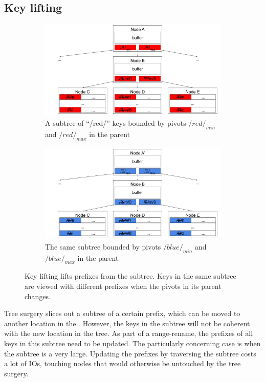\subsection{Key lifting}

\begin{figure}
    \begin{subfigure}{\textwidth}
        \centering
        \includegraphics[width=.9\linewidth]{fig/lift-1}
        \caption{\label{subfig:lift-1} A subtree of ``/red/'' keys bounded by
            pivots $/red/_{min}$ and $/red/_{max}$ in the parent}
    \end{subfigure}
    \begin{subfigure}{\textwidth}
        \centering
        \includegraphics[width=.9\linewidth]{fig/lift-2}
        \caption{\label{subfig:lift-2} The same subtree bounded by pivots
            $/blue/_{min}$ and $/blue/_{max}$ in the parent}
    \end{subfigure}
    \caption[Key lifting example]{\label{fig:lift}
        Key lifting lifts prefixes from the subtree. Keys in the same subtree
        are viewed with different prefixes when the pivots in its parent
        changes.}
\end{figure}

Tree surgery slices out a subtree of a certain prefix, which can be moved to
another location in the \bet.
However, the keys in the subtree will not be coherent with the new location in
the tree.
As part of a range-rename, the prefixes of all keys in this subtree need to be
updated.
The particularly concerning case is when the subtree is a very large.
Updating the prefixes by traversing the subtree costs a lot of IOs, touching
nodes that would otherwise be untouched by the tree surgery.

